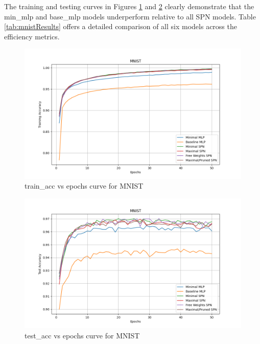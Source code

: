 The training and testing curves in Figures \ref{fig:mnistTrainCurve} and \ref{fig:mnistTestCurve} clearly demonstrate that the min\_mlp and base\_mlp models underperform relative to all SPN models. Table \ref{tab:mnistResults} offers a detailed comparison of all six models across the efficiency metrics.

\begin{figure}[H]
    \centering
    \includegraphics[width=\linewidth]{Figures/Results/MNIST/training_accuracy_plot.png} %
    \captionsetup{width=\linewidth}
    \caption{train\_acc vs epochs curve for MNIST}
    \label{fig:mnistTrainCurve}
\end{figure}

\begin{figure}[H]
    \centering
    \includegraphics[width=\linewidth]{Figures/Results/MNIST/test_accuracy_plot.png} %
    \captionsetup{width=\linewidth}
    \caption{test\_acc vs epochs curve for MNIST}
    \label{fig:mnistTestCurve}
\end{figure}

